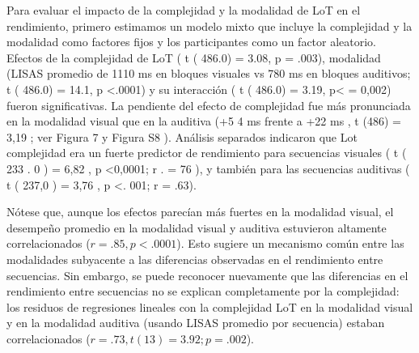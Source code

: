 Para evaluar el impacto de la complejidad y la modalidad de LoT en el rendimiento, primero estimamos un modelo mixto que incluye la complejidad y la modalidad como factores fijos y los participantes como un factor aleatorio. Efectos de la complejidad de LoT ( t ( 486.0) = 3.08, p = .003), modalidad (LISAS promedio de 1110 ms en bloques visuales vs 780 ms en bloques auditivos; t ( 486.0) = 14.1, p <.0001) y su interacción ( t ( 486.0) = 3.19, p< = 0,002) fueron significativas. La pendiente del efecto de complejidad fue más pronunciada en la modalidad visual que en la auditiva (+5 4 ms frente a +22 ms , t (486) = 3,19 ; ver Figura 7 y Figura S8 ). Análisis separados indicaron que Lot complejidad era un fuerte predictor de rendimiento para secuencias visuales ( t ( 233 . 0 ) = 6,82 , p <0,0001; r . = 76 ), y también para las secuencias auditivas ( t ( 237,0 ) = 3,76 , p <. 001; r = .63).


Nótese que, aunque los efectos parecían más fuertes en la modalidad visual, el desempeño promedio en la modalidad visual y auditiva estuvieron altamente correlacionados ($r = .85, p <.0001$). Esto sugiere un mecanismo común entre las modalidades subyacente a las diferencias observadas en el rendimiento entre secuencias. Sin embargo, se puede reconocer nuevamente que las diferencias en el rendimiento entre secuencias no se explican completamente por la complejidad: los residuos de regresiones lineales con la complejidad LoT en la modalidad visual y en la modalidad auditiva (usando LISAS promedio por secuencia) estaban correlacionados ($r =.73, t (13) = 3.92; p = .002$).


